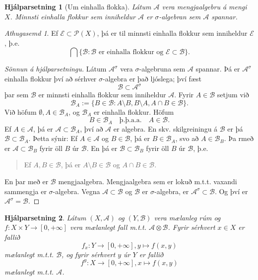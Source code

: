 \documentclass[a4paper,icelandic,11pt]{book}
\theoremstyle{plain}      \newtheorem{setn}{Setning}[chapter]
\newtheorem{lemma}[setn]{Hjálparsetning}
\theoremstyle{definition} \newtheorem{skilgr}[setn]{Skilgreining}
\theoremstyle{remark}     \newtheorem*{ath}{Athugasemd}
\begin{document}
\begin{lemma}
  [Um einhalla flokka]
  Látum $\mathcal A$ vera mengjaalgebru á mengi $X$. Minnsti einhalla
  flokkur sem inniheldur $\mathcal A$ er $\sigma$-algebran sem
  $\mathcal A$ spannar.
\end{lemma}
\begin{ath}
  Ef $\mathcal E\subset\mathcal P(X)$, þá er til minnsti einhalla
  flokkur sem inniheldur $\mathcal E$, þ.e. 
  \[
  \bigcap\{ \mathcal B : \mathcal B\text{ er einhalla flokkur og
  }\mathcal E \subset \mathcal B \}.
  \]
\end{ath}
\begin{proof}
  [Sönnun á hjálparsetningu]
  Látum $\mathcal A^{\sigma}$ vera $\sigma$-algebruna sem $\mathcal A$
  spannar. Þá er $\mathcal A^{\sigma}$ einhalla flokkur því að sérhver
  $\sigma$-algebra er það ljóslega; því fæst 
  \[
  \mathcal B\subset \mathcal A^{\sigma}
  \]
  þar sem $\mathcal B$ er minnsti einhalla flokkur sem inniheldur
  $\mathcal A$. Fyrir $A\in\mathcal B$ setjum við 
  \[
  \mathcal B_{A} := \{ B\in \mathcal B
  : A\setminus B, B\setminus A, A\cap B\in \mathcal B
  \}.
  \]
  Við höfum $\emptyset,A\in\mathcal B_{A}$, og $\mathcal B_{A}$ er
  einhalla flokkur. Höfum 
  \[
  B\in \mathcal B_{A}
  \quad\text{þ.þ.a.a.}\quad
  A\in\mathcal B.
  \]
  Ef $A\in\mathcal A$, þá er $\mathcal A\subset\mathcal B_{A}$, því að
  $\mathcal A$ er algebra. En skv. skilgreiningu á $\mathcal B$ er þá
  $\mathcal B\subset\mathcal B_{A}$. Þetta sýnir: Ef $A\in\mathcal A$
  og $B\in\mathcal B$, þá er $B\in\mathcal B_{A}$, svo að
  $A\in\mathcal B_{B}$. Þa rmeð er $\mathcal A\subset\mathcal B_{B}$
  fyrir öll $B$ úr $\mathcal B$. En þá er $\mathcal B\subset\mathcal
  B_{B}$ fyrir öll $B$ úr $\mathcal B$, þ.e.
  \begin{quote}
    Ef $A,B\in\mathcal B$, þá er $A\setminus B\in\mathcal B$ og $A\cap
    B\in\mathcal B$.
  \end{quote}
  En þar með er $\mathcal B$ mengjaalgebra. Mengjaalgebra sem er lokuð
  m.t.t. vaxandi sammengja er $\sigma$-algebra. Vegna $\mathcal
  A\subset\mathcal B$ og $\mathcal B$ er $\sigma$-algebra, er
  $\mathcal A^{\sigma}\subset\mathcal B$. Og því er $\mathcal
  A^{\sigma}=\mathcal B$.
\end{proof}
\begin{lemma}
  Látum $(X,\mathcal A)$ og $(Y,\mathcal B)$ vera mælanleg rúm og
  $f:X\times Y\to[0,+\infty]$ vera mælanlegt fall m.t.t. $\mathcal
  A\otimes\mathcal B$. Fyrir sérhvert $x\in X$ er fallið 
  \[
  f_{x} : Y\to[0,+\infty], y\mapsto f(x,y)
  \]
  mælanlegt m.t.t. $\mathcal B$, og fyrir sérhvert $y$ úr $Y$ er
  fallið 
  \[
  f^{y}:X\to[0,+\infty],x\mapsto f(x,y)
  \]
  mælanlegt m.t.t. $\mathcal A$.
\end{lemma}
\end{document}

